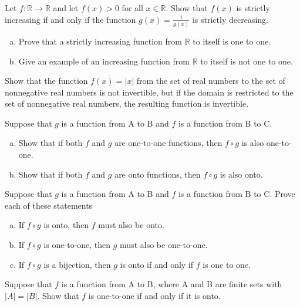 \documentclass{article}
\newenvironment{problem}[2][Problem]{\begin{trivlist}
\item[\hskip \labelsep {\bfseries #1}\hskip \labelsep {\bfseries #2.}]}{\end{trivlist}}
\begin{document}
\begin{problem}{5}[Chapter 2.3, Question 24]
Let $ f: \mathbb{R} \rightarrow \mathbb{R}$ and let $ f(x) > 0 $ for all $ x \in \mathbb{R}$. Show that $f(x)$ is strictly increasing if and only if the function $g(x) = \frac{1}{g(x)}$ is strictly decreasing. 
\end{problem}


\begin{problem}{6}[Chapter 2.3, Question 26]
\begin{enumerate}[(a)]
    \item Prove that a strictly increasing function from $\mathbb{R}$ to itself is one to one.
    \item Give an example of an increasing function from $\mathbb{R}$ to itself is not one to one.
\end{enumerate}
\end{problem}


\begin{problem}{7}[Chapter 2.3, Question 29]
Show that the function $f(x) = \lvert x \rvert$ from the set of real numbers to the set of nonnegative real numbers is not invertible, but if the domain
is restricted to the set of nonnegative real numbers, the resulting function is invertible.

\end{problem}
\begin{problem}{8}[Chapter 2.3, Question 33]
Suppose that $g$ is a function from A to B and $f$ is a function from B to C.
\begin{enumerate}[(a)]
    \item Show that if both $f$ and $g$ are one-to-one functions,
    then $f \circ g$ is also one-to-one.
    \item Show that if both $f$ and $g$ are onto functions, then $f \circ g$
    is also onto.
\end{enumerate}    
    
\end{problem}
\begin{problem}{9}[Chapter 2.3, Question 34]
Suppose that $g$ is a function from A to B and $f$ is a function from B to C. Prove each of these statements
    \begin{enumerate}[(a)]
        \item If $f \circ g$ is onto, then $f$ must also be onto.
        \item If $f \circ g$ is one-to-one, then $g$ must also be one-to-one.
        \item If $f \circ g$ is a bijection, then $g$ is onto if and only if $f$ is one to one. 
    \end{enumerate}    
        
\end{problem}
\begin{problem}{10}[Chapter 2.3, Question 74]
    Suppose that $f$ is a function from A to B, where A and B
    are finite sets with $ \lvert A \rvert =  \lvert B \rvert$. Show that $f$ is one-to-one if
    and only if it is onto.
\end{problem}
\end{document}
